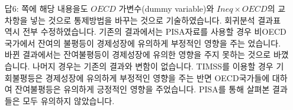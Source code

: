 \begin{itemize}
    \item[답6:] \pageref{ans6}쪽에 해당 내용을도 $OECD$ 가변수(dummy variable)와 $Ineq \times OECD $의 교차항을 넣는 것으로 통제방법을 바꾸는 것으로 기술하였습니다. 회귀분석 결과표 역시 전부 수정하였습니다. 기존의 결과에서는 PISA자료를 사용할 경우 비OECD국가에서 잔여의 불평등이 경제성장에 유의하게 부정적인 영향을 주는 었습니다. 바뀐 결과에서는 잔여불평등이 경제성장에 유의한 영향을 주지 못하는 것으로 바꼈습니다. 나머지 경우는 기존의 결과와 변함이 없습니다. TIMSS를 이용할 경우 기회불평등은 경제성장에 유의하게 부정적인 영향을 주는 반면 OECD국가들에 대하여 잔여불평등은 유의하게 긍정적인 영향을 주었습니다. PISA를 통해 살펴본 결과들은 모두 유의하지 않았습니다. 
\end{itemize}
    